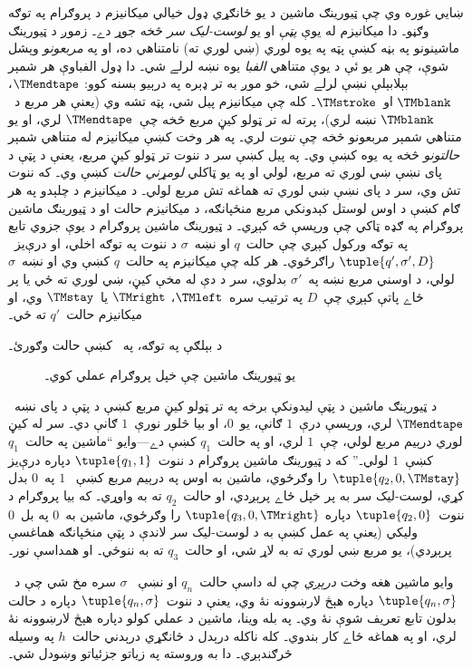 \documentclass[../../../include/open-logic-section]{subfiles}
\begin{document}
\begin{explain}
ښايي غوره وي چې ټيورينګ ماشين د يو ځانګړي ډول خيالي ميکانيزم د
پروګرام په توګه وګڼو۔ دا ميکانيزم له يوې \emph{پټې} او يو
\emph{لوست-ليک سر} څخه جوړ دے۔ زموږ د ټيورينګ ماشينونو په بڼه کښې
پټه په يوه لوري (ښي لوري ته) نامتناهي ده، او په \emph{مربعونو} وېشل
شوې، چې هر يو ئې د يوې متناهي \emph{الفبا} يوه نښه لرلے شي۔ دا ډول
الفباوې هر شمېر بېلابېلې نښې لرلے شي، خو موږ به تر ډېره په درېيو بسنه
کوو: $\TMendtape$، $\TMblank$ او~$\TMstroke$۔ کله چې ميکانيزم پيل
شي، پټه تشه وي (يعنې هر مربع د~$\TMblank$ نښه لري)، پرته له تر ټولو
کيڼ مربع څخه چې~$\TMendtape$ لري، او يو متناهي شمېر مربعونو څخه چې
\emph{ننوت} لري۔ په هر وخت کښې ميکانيزم له متناهي شمېر
\emph{حالتونو} څخه په يوه کښې وي۔ په پيل کښې سر د ننوت تر ټولو کيڼ
مربع، يعنې د پټې د پای نښې ښي لوري ته مربع، لولي او په يو ټاکلي
\emph{لومړني حالت} کښې وي۔ که ننوت تش وي، سر د پای نښې ښي لوري ته هماغه تش مربع لولي۔ د ميکانيزم د چلېدو په هر ګام کښې د اوس
لوستل کېدونکي مربع منځپانګه، د ميکانيزم حالت او د ټيورينګ ماشين
پروګرام په ګډه ټاکي چې ورپسې څه کېږي۔ د ټيورينګ ماشين پروګرام د يوې
جزوي تابع په توګه ورکول کېږي چې حالت~$q$ او نښه~$\sigma$ د ننوت په
توګه اخلي، او درې‌يز~$\tuple{q', \sigma', D}$ راګرځوي۔ هر کله چې
ميکانيزم په حالت~$q$ کښې وي او نښه~$\sigma$ لولي، د اوسني مربع نښه
په~$\sigma'$ بدلوي، سر د دې له مخې کيڼ، ښي لوري ته ځي يا پر ځاے پاتې
کېږي چې~$D$ په ترتيب سره~$\TMleft$، $\TMright$ يا~$\TMstay$ وي، او
ميکانيزم حالت~$q'$ ته ځي۔

د بېلګې په توګه، په~ کښې حالت وګورئ۔
\begin{figure}
  \caption{يو ټيورينګ ماشين چې خپل پروګرام عملي کوي۔}
\end{figure}
د ټيورينګ ماشين د پټې ليدونکې برخه په تر ټولو کيڼ مربع کښې د پټې د
پای نښه~$\TMendtape$ لري، ورپسې درې~$1$ ګانې، يو~$0$، او بيا څلور
نورې~$1$ ګانې دي۔ سر له کيڼ لوري درېيم مربع لولي، چې~$1$ لري، او په
حالت~$q_1$ کښې دے---وايو ``ماشين په حالت~$q_1$ کښې~$1$ لولي۔'' که
د ټيورينګ ماشين پروګرام د ننوت~$\tuple{q_1, 1}$ دپاره درې‌يز
$\tuple{q_2, 0, \TMstay}$ را وګرځوي، ماشين به اوس په درېيم مربع کښې
~$1$ په~$0$ بدل کړي، لوست-ليک سر به پر خپل ځاے پرېږدي، او حالت~$q_2$
ته به واوړي۔ که بيا پروګرام د ننوت~$\tuple{q_2, 0}$ دپاره
$\tuple{q_3, 0, \TMright}$ را وګرځوي، ماشين به~$0$ په بل~$0$ وليکي
(يعنې په عمل کښې به د لوست-ليک سر لاندې د پټې منځپانګه هماغسې
پرېږدي)، يو مربع ښي لوري ته به لاړ شي، او حالت~$q_3$ ته به ننوځي۔ او
همداسې نور۔

وايو ماشين هغه وخت \emph{درېږي} چې له داسې حالت~$q_n$ او نښې
~$\sigma$ سره مخ شي چې د~$\tuple{q_n, \sigma}$ دپاره هېڅ لارښوونه
نۀ وي، يعنې د ننوت~$\tuple{q_n,\sigma}$ دپاره د حالت بدلون تابع
تعريف شوې نۀ وي۔ په بله وينا، ماشين د عملي کولو دپاره هېڅ لارښوونه
نۀ لري، او په هماغه ځاے کار بندوي۔ کله ناکله درېدل د ځانګړي درېدني
حالت~$h$ په وسيله څرګندېږي۔ دا به وروسته په زياتو جزئياتو وښودل شي۔
\end{explain}
\end{document}
